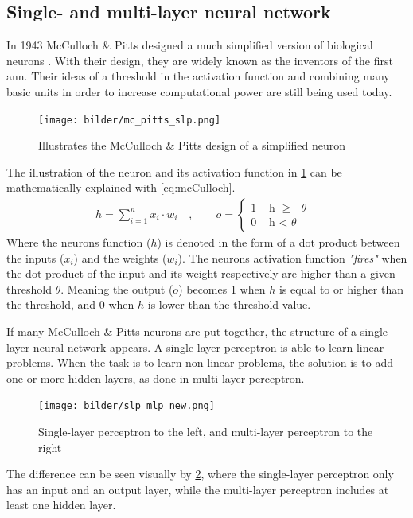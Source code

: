 \documentclass[USenglish]{ifimaster}  %
\begin{document}
\subsection{Single- and multi-layer neural network}
In 1943 McCulloch \& Pitts designed a much simplified version of biological neurons \cite{mcculloch_pitts}. With their design, they are widely known as the inventors of the first \ac{ann}. Their ideas of a threshold in the activation function and combining many basic units in order to increase computational power are still being used today.
\begin{figure}[ht]
    \centering
    \texttt{[image: bilder/mc\_pitts\_slp.png]}
    \caption{Illustrates the McCulloch \& Pitts design of a simplified neuron}
    \label{fig:mcculoch_and_pitts}
\end{figure}
The illustration of the neuron and its activation function in \cref{fig:mcculoch_and_pitts} can be mathematically explained with \cref{eq:mcCulloch}.
\begin{equation}\label{eq:mcCulloch}
\begin{aligned}
    {h = \sum_{i=1}^{n} x_i \cdot w_i \quad , \quad\quad o =
\begin{cases}
    1 & \text{ h $\geq$ $\theta$ }  \\
    0 & \text{ h < $\theta$ }
\end{cases}}
\end{aligned}
\end{equation}
Where the neurons function ($h$) is denoted in the form of a dot product between the inputs ($x_i$) and the weights ($w_i$). The neurons activation function \textit{"fires"} when the dot product of the input and its weight respectively are higher than a given threshold $\theta$. Meaning the output ($o$) becomes 1 when $h$ is equal to or higher than the threshold, and 0 when $h$ is lower than the threshold value.

If many McCulloch \& Pitts neurons are put together, the structure of a single-layer neural network appears. A single-layer perceptron is able to learn linear problems. When the task is to learn non-linear problems, the solution is to add one or more hidden layers, as done in multi-layer perceptron.   
\begin{figure}[ht]
    \centering
    \texttt{[image: bilder/slp\_mlp\_new.png]}
    \caption{Single-layer perceptron to the left, and multi-layer perceptron to the right}
    \label{fig:slp_mlp}
\end{figure}
The difference can be seen visually by \cref{fig:slp_mlp}, where the single-layer perceptron only has an input and an output layer, while the multi-layer perceptron includes at least one hidden layer.
\end{document}
